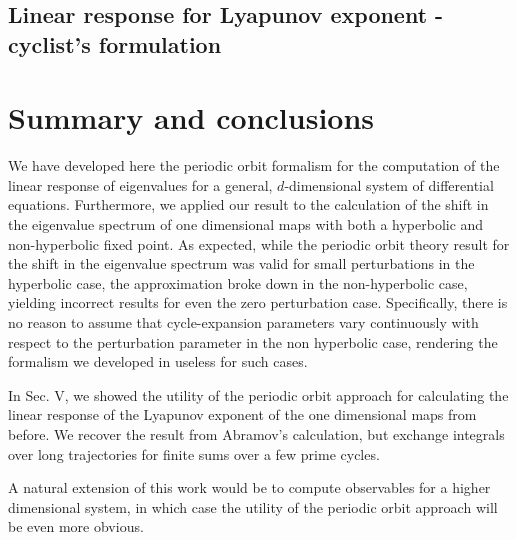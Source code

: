 \documentclass[aps,pre,
                showpacs,
                twocolumn,
                groupedaddress,
                superscriptaddress,
                floatfix]{revtex4-1}
\begin{document}
\subsection{Linear response for Lyapunov exponent - cyclist's formulation}
\label{sect:LinrespLyapCycl}

\section{Summary and conclusions}
\label{sect:concl}

We have developed here the periodic orbit formalism for the computation of the
linear response of eigenvalues for a general, $d$-dimensional system of
differential equations. Furthermore, we applied our result to the
calculation of the shift in the eigenvalue spectrum of one dimensional
maps with both a hyperbolic and non-hyperbolic fixed point. As expected,
while the periodic orbit theory result for the shift in the eigenvalue
spectrum was valid for small perturbations in the hyperbolic case, the
approximation broke down in the non-hyperbolic case, yielding incorrect
results for even the zero perturbation case. Specifically, there is no
reason to assume that cycle-expansion parameters vary continuously with
respect to the perturbation parameter in the non hyperbolic case,
rendering the formalism we developed in  useless for such cases.

In Sec. V, we showed the utility of the periodic orbit approach for
calculating the linear response of the Lyapunov exponent of the one
dimensional maps from before. We recover the result from Abramov's
calculation, but exchange integrals over long trajectories for finite
sums over a few prime cycles.

A natural extension of this work would be to compute observables for a
higher dimensional system, in which case the utility of the periodic
orbit approach will be even more obvious.
\end{document}
